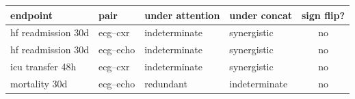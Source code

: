 \begin{tabular}{llllc}
\toprule
\textbf{endpoint} & \textbf{pair} & \textbf{under attention} & \textbf{under concat} & \textbf{sign flip?} \\
\midrule
hf readmission 30d & ecg--cxr & indeterminate & synergistic & no \\
hf readmission 30d & ecg--echo & indeterminate & synergistic & no \\
icu transfer 48h & ecg--cxr & indeterminate & synergistic & no \\
mortality 30d & ecg--echo & redundant & indeterminate & no \\
\bottomrule
\end{tabular}
